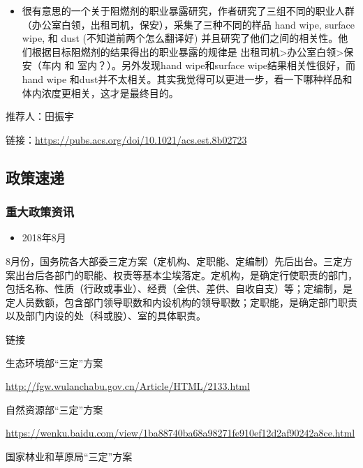 \documentclass[]{book}
\providecommand{\tightlist}{%
  \setlength{\itemsep}{0pt}\setlength{\parskip}{0pt}}
\begin{document}
\begin{itemize}
\tightlist
\item
  很有意思的一个关于阻燃剂的职业暴露研究，作者研究了三组不同的职业人群（办公室白领，出租司机，保安），采集了三种不同的样品 hand wipe, surface wipe, 和 dust (不知道前两个怎么翻译好) 并且研究了他们之间的相关性。他们根据目标阻燃剂的结果得出的职业暴露的规律是 出租司机\textgreater{}办公室白领\textgreater{}保安（车内 和 室内？）。另外发现hand wipe和surface wipe结果相关性很好，而hand wipe 和dust并不太相关。其实我觉得可以更进一步，看一下哪种样品和体内浓度更相关，这才是最终目的。
\end{itemize}

推荐人：田振宇

链接：\url{https://pubs.acs.org/doi/10.1021/acs.est.8b02723}

\hypertarget{ux653fux7b56ux901fux9012-4}{%
\subsection*{政策速递}\label{ux653fux7b56ux901fux9012-4}}

\hypertarget{ux91cdux5927ux653fux7b56ux8d44ux8baf-4}{%
\subsubsection*{重大政策资讯}\label{ux91cdux5927ux653fux7b56ux8d44ux8baf-4}}

\begin{itemize}
\tightlist
\item
  2018年8月
\end{itemize}

8月份，国务院各大部委三定方案（定机构、定职能、定编制）先后出台。三定方案出台后各部门的职能、权责等基本尘埃落定。定机构，是确定行使职责的部门，包括名称、性质（行政或事业）、经费（全供、差供、自收自支）等；定编制，是定人员数额，包含部门领导职数和内设机构的领导职数；定职能，是确定部门职责以及部门内设的处（科或股）、室的具体职责。

链接

生态环境部``三定''方案

\url{http://fgw.wulanchabu.gov.cn/Article/HTML/2133.html}

自然资源部``三定''方案

\url{https://wenku.baidu.com/view/1ba88740ba68a98271fe910ef12d2af90242a8ce.html}

国家林业和草原局``三定''方案
\end{document}
